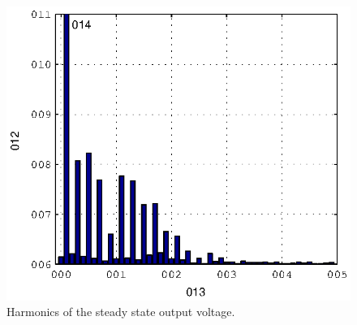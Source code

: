 \documentclass[conference,10pt]{IEEEtran}
\begin{document}
\begin{figure}[!h]
\centering

\includegraphics{fig/steady_state_harmonics}
\caption{Harmonics of the steady state output voltage.}
\label{fig:ss_harm}
\end{figure}






\end{document}
